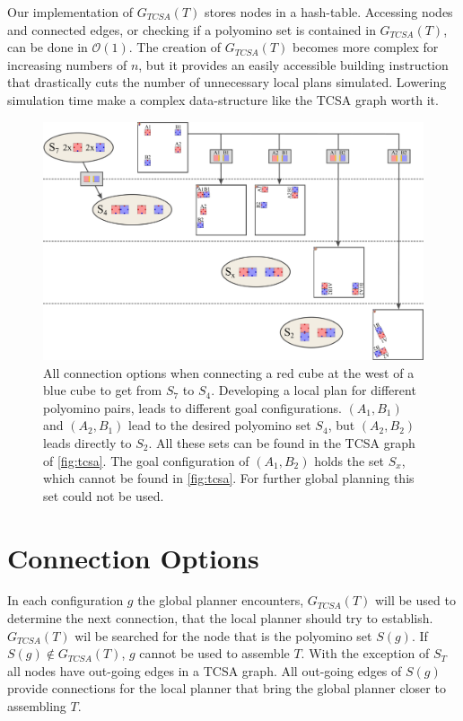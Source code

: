Our implementation of $G_{TCSA}(T)$ stores nodes in a hash-table.
Accessing nodes and connected edges, or checking if a polyomino set is contained in $G_{TCSA}(T)$, can be done in  $\mathcal{O}(1)$.
The creation of $G_{TCSA}(T)$ becomes more complex for increasing numbers of $n$, but it provides an easily accessible building instruction that drastically cuts the number of unnecessary local plans simulated.
Lowering simulation time make a complex data-structure like the TCSA graph worth it.


\begin{figure}
	\centering
	\includegraphics[width=1\textwidth]{figures/connect_options.pdf}
	\caption[Example of connection options for one two-cut-sub-assembly edge]{All connection options when connecting a red cube at the west of a blue cube to get from $S_7$ to $S_4$. Developing a local plan for different polyomino pairs, leads to different goal configurations. $(A_1,B_1)$ and $(A_2,B_1)$ lead to the desired polyomino set $S_4$, but $(A_2,B_2)$ leads directly to $S_2$. All these sets can be found in the TCSA graph of \autoref{fig:tcsa}. The goal configuration of $(A_1, B_2)$ holds the set $S_x$, which cannot be found in \autoref{fig:tcsa}. For further global planning this set could not be used.}
	\label{fig:connect_options}
\end{figure}


\section{Connection Options}
\label{sec:connect_options}

In each configuration $g$ the global planner encounters, $G_{TCSA}(T)$ will be used to determine the next connection, that the local planner should try to establish.
$G_{TCSA}(T)$ wil be searched for the node that is the polyomino set $S(g)$.
If $S(g) \notin G_{TCSA}(T)$, $g$ cannot be used to assemble $T$.
With the exception of $S_T$ all nodes have out-going edges in a TCSA graph.
All out-going edges of $S(g)$ provide connections for the local planner that bring the global planner closer to assembling $T$.

